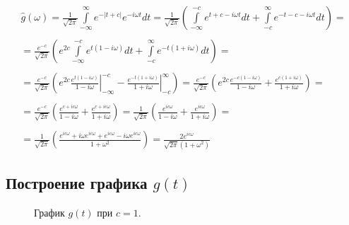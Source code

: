 \documentclass[a5paper, 10pt]{article}
\theoremstyle{definition}
\theoremstyle{plain}
\theoremstyle{remark}
\begin{document}
\begin{multline}
\hat{g}(\omega) =  \frac{1}{\sqrt{2 \pi}} \int \limits_{-\infty}^{\infty}  e^{-|t + c|} e^{-i \omega t} dt = 
 \frac{1}{\sqrt{2 \pi}} \left(  \int \limits_{-\infty}^{-c}  e^{t + c -i \omega t} dt  +  \int \limits_{-c}^{\infty}  e^{-t - c -i \omega t} dt   \right) = \\
\\
= \frac{e^{-c}}{\sqrt{2 \pi}} \left( e^{2c} \int \limits_{-\infty}^{-c}  e^{t(1 -i \omega)} dt  + \int \limits_{-c}^{\infty}  e^{-t(1+i \omega)} dt   \right) = \\
\\
 =\frac{e^{-c}}{\sqrt{2 \pi}} \left( e^{2c} \left.  \frac{e^{t(1 -i \omega)}}{1 -i \omega} \right|_{-\infty}^{-c}  - \left. \frac{e^{-t(1+i \omega)}}{1+i \omega}  \right|_{-c}^{\infty}  \right) =
\frac{e^{-c}}{\sqrt{2 \pi}} \left( e^{2c}   \frac{e^{-c(1 -i \omega)}}{1 -i \omega} +  \frac{e^{c(1+i \omega)}}{1+i \omega}  \right) = \\
\\
= \frac{e^{-c}}{\sqrt{2 \pi}} \left(   \frac{e^{c +ic \omega}}{1 -i \omega} +  \frac{e^{c+i c\omega}}{1+i \omega}  \right) =
\frac{1}{\sqrt{2 \pi}} \left(   \frac{e^{ic \omega}}{1 -i \omega} +  \frac{e^{i c\omega}}{1+i \omega}  \right)=\\
\\
= \frac{1}{\sqrt{2 \pi}} \left(   \frac{e^{ic \omega} + i \omega e^{ic \omega} + e^{ic \omega} -  i \omega e^{ic \omega}}{1 + \omega^2}  \right)=
\frac{2e^{ic \omega} }{\sqrt{2 \pi}(1 + \omega^2)}
\end{multline}



\newpage
\subsection{Построение графика $g(t)$}

\begin{figure}[h!]
\caption{График $g(t)$ при $c = 1$.}
\end{figure}
\end{document}
